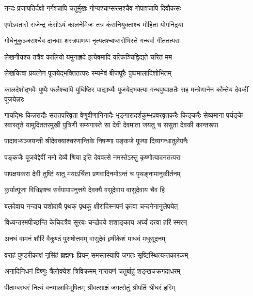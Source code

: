 \twolineshloka
{नन्दः प्रजापतिर्दक्षो गर्गश्चापि चतुर्मुखः}
{गोप्यश्चाप्सरसश्चैव गोपाश्चापि दिवौकसः}%

\twolineshloka
{एषोऽवतारो राजेन्द्र कंसोऽयं कालनेमिजः}
{तत्र कंसनियुक्ताश्च मोहिता योगनिद्रया}%

\twolineshloka
{गोधेनुकुञ्जराश्चैव दानवाः शस्त्रपाणयः}
{नृत्यतश्चाप्सरोभिस्ते गन्धर्वा गीततत्पराः}%

\twolineshloka
{लेखनीयश्च तत्रैव कालियो यमुनाह्रदे}
{इत्येवमादि यत्किञ्चिद्विद्यते चरितं मम}%

\twolineshloka
{लेखयित्वा प्रयत्नेन पूजयेद्भक्तितत्परः}
{रम्यमेवं बीजपूरैः पुष्पमालादिशोभितम्}%

\threelineshloka
{कालदेशोद्भवैः पुष्पैः फलैश्चापि युधिष्ठिर}
{पाद्यार्घ्यैः पूजयेद्भक्त्या गन्धपुष्पाक्षतैः सह}
{मन्त्रेणानेन कौन्तेय देवकीं पूजयेन्नरः}%

\fourlineindentedshloka
{गायद्भिः किन्नराद्यैः सततपरिवृता वेणुवीणानिनादैः}
{भृङ्गारादर्शकुम्भप्रवरवृतकरैः किङ्करैः सेव्यमाना}
{पर्यङ्के स्वास्तृते यामुदिततरमुखी पुत्रिणी सम्यगास्ते}
{सा देवी देवमाता जयतु च ससुता देवकी कान्तरूपा}%


\twolineshloka
{पादावभ्यञ्जयन्ती श्रीदेवक्याश्चरणान्तिके}
{निषण्णा पङ्कजे पूज्या दिव्यगन्धातुलेपनैः}%


\twolineshloka
{पङ्कजैः पूजयेद्देवीं नमो देव्यै श्रिया इति}
{देववत्से नमस्तेऽस्तु कृष्णोत्पादनतत्परा}%


\twolineshloka
{पापक्षयकरा देवी तुष्टिं यातु मयाऽर्चिता}
{प्रणवादिनमोऽन्तं च पृथङ्नामानुकीर्तनम्}%


\twolineshloka
{कुर्यात्पूजा विधिज्ञश्च सर्वपापापनुत्तये}
{देवक्यै वसुदेवाय वासुदेवाय चैव हि}%


\twolineshloka
{बलदेवाय नन्दाय यशोदायै पृथक् पृथकू}
{क्षीरादिस्नपनं कृत्वा चन्दनेनानुलेपयेत्}%


\twolineshloka
{विध्यन्तरमपीच्छन्ति केचिदत्रैव सूरयः}
{चन्द्रोदये शशाङ्काय अर्घ्यं दत्त्वा हरिं स्मरन्}%


\twolineshloka
{अनघं वामनं शौरिं वैकुण्ठं पुरुषोत्तमम्}
{वासुदेवं हृषीकेशं माधवं मधुसूदनम्}%


\twolineshloka
{वराहं पुण्डरीकाक्षं नृसिंहं ब्रह्मणः प्रियम्}
{समस्तस्यापि जगतः सृष्टिस्थित्यन्तकारकम्}%


\twolineshloka
{अनादिनिधनं विष्णुः त्रैलोक्येशं त्रिविक्रमम्}
{नारायणं चतुर्बाहुं शङ्खचक्रगदाधरम्}%


\twolineshloka
{पीताम्बरधरं नित्यं वनमालाविभूषितम्}
{श्रीवत्साक्षं जगत्सेतुं श्रीपतिं श्रीधरं हरिम्}%


